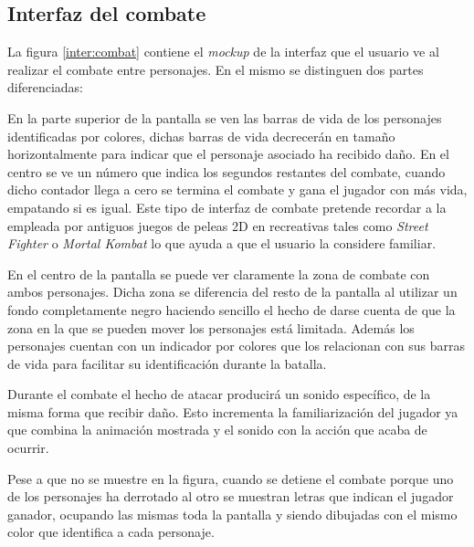 \subsection{Interfaz del combate}

La figura \ref{inter:combat} contiene el \textit{mockup} de la interfaz que el usuario ve al realizar el combate entre personajes. En el mismo se distinguen dos partes diferenciadas:

\bigskip

En la parte superior de la pantalla se ven las barras de vida de los personajes identificadas por colores, dichas barras de vida decrecerán en tamaño horizontalmente para indicar que el personaje asociado ha recibido daño. En el centro se ve un número que indica los segundos restantes del combate, cuando dicho contador llega a cero se termina el combate y gana el jugador con más vida, empatando si es igual. Este tipo de interfaz de combate pretende recordar a la empleada por antiguos juegos de peleas 2D en recreativas tales como \textit{Street Fighter} o \textit{Mortal Kombat} lo que ayuda a que el usuario la considere familiar.

\bigskip

En el centro de la pantalla se puede ver claramente la zona de combate con ambos personajes. Dicha zona se diferencia del resto de la pantalla al utilizar un fondo completamente negro haciendo sencillo el hecho de darse cuenta de que la zona en la que se pueden mover los personajes está limitada. Además los personajes cuentan con un indicador por colores que los relacionan con sus barras de vida para facilitar su identificación durante la batalla.

\bigskip

Durante el combate el hecho de atacar producirá un sonido específico, de la misma forma que recibir daño. Esto incrementa la familiarización del jugador ya que combina la animación mostrada y el sonido con la acción que acaba de ocurrir.

\bigskip

Pese a que no se muestre en la figura, cuando se detiene el combate porque uno de los personajes ha derrotado al otro se muestran letras que indican el jugador ganador, ocupando las mismas toda la pantalla y siendo dibujadas con el mismo color que identifica a cada personaje.

